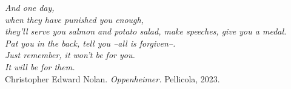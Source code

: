 \thispagestyle{empty}
\begin{flushright}
    \emph{And one day,\\
    when they have punished you enough,\\
    they'll serve you salmon and potato salad, make speeches, give you a medal.\\
    Pat you in the back, tell you --all is forgiven--. \\
    Just remember, it won't be for you.\\ It will be for them.\\}
    \vspace{1cm}
    Christopher Edward Nolan. \emph{Oppenheimer.} 
    Pellicola, 2023.
\end{flushright}
